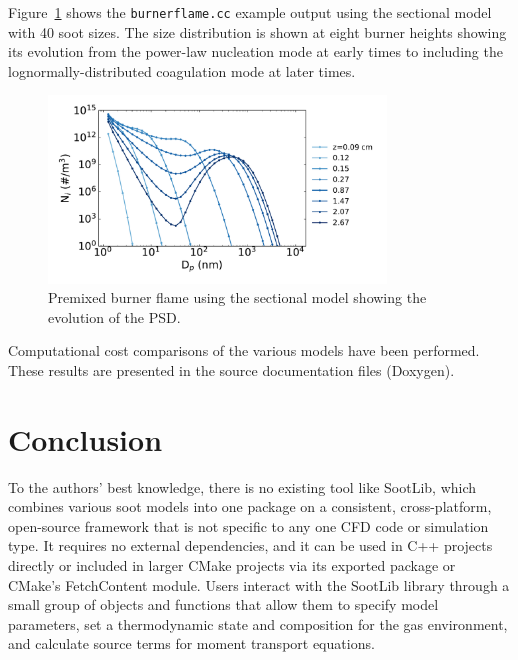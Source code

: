 \documentclass[preprint,letterpaper]{elsarticle}
\begin{document}
Figure~\ref{f:sectional} shows the \texttt{burner\textunderscore flame.cc} example output using the sectional model with 40 soot sizes. The size distribution is shown at eight burner heights showing its evolution from the power-law nucleation mode at early times to including the lognormally-distributed coagulation mode at later times.
%
\begin{figure}
    \begin{center}
        \includegraphics[width=0.8\textwidth]{fig_sectional.pdf}
    \end{center}
    \caption{Premixed burner flame using the sectional model showing the evolution of the PSD.}
    \label{f:sectional}
\end{figure}
%

Computational cost comparisons of the various models have been performed. These results are presented in the source documentation files (Doxygen).


\section{Conclusion}
\label{s:soot-conclusion}

To the authors' best knowledge, there is no existing tool like SootLib, which combines various soot models into one package on a consistent, cross-platform, open-source framework that is not specific to any one CFD code or simulation type. It requires no external dependencies, and it can be used in C++ projects directly or included in larger CMake projects via its exported package or CMake's FetchContent module. Users interact with the SootLib library through a small group of objects and functions that allow them to specify model parameters, set a thermodynamic state and composition for the gas environment, and calculate source terms for moment transport equations.
\end{document}
